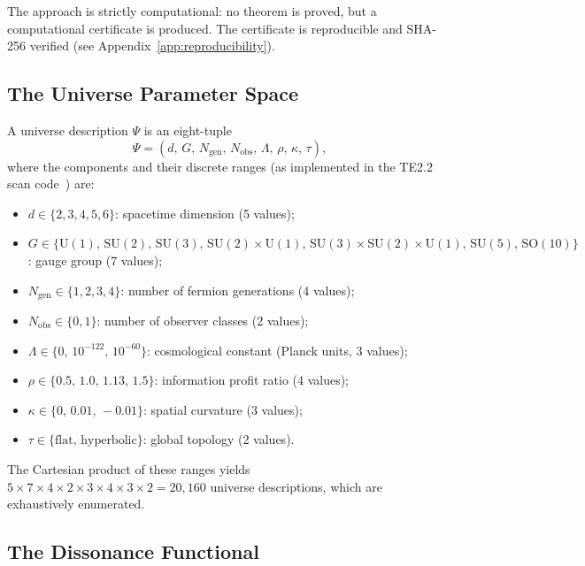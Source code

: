 \documentclass[11pt,twocolumn]{article}
\theoremstyle{remark}
\begin{document}
The approach is strictly computational: no theorem is proved, but a
computational certificate is produced.
The certificate is reproducible and SHA-256 verified
(see Appendix~\ref{app:reproducibility}).

\subsection{The Universe Parameter Space}
\label{sec:params}

A universe description $\Psi$ is an eight-tuple
\begin{equation}
  \Psi = (d,\, G,\, N_{\mathrm{gen}},\, N_{\mathrm{obs}},\, \Lambda,\,
         \rho,\, \kappa,\, \tau),
  \label{eq:psi}
\end{equation}
where the components and their discrete ranges (as implemented in the
TE2.2 scan code~\cite{SpivackPSCConcordance,ugp-physics-repo}) are:
\begin{itemize}
  \item $d \in \{2, 3, 4, 5, 6\}$: spacetime dimension (5 values);
  \item $G \in \{\mathrm{U}(1),\allowbreak\, \mathrm{SU}(2),\allowbreak\,
                \mathrm{SU}(3),\allowbreak\,
                \mathrm{SU}(2){\times}\mathrm{U}(1),\allowbreak\,
                \mathrm{SU}(3){\times}\mathrm{SU}(2){\times}\mathrm{U}(1),\allowbreak\,
                \mathrm{SU}(5),\allowbreak\, \mathrm{SO}(10)\}$:
                gauge group (7 values);
  \item $N_{\mathrm{gen}} \in \{1, 2, 3, 4\}$: number of fermion
        generations (4 values);
  \item $N_{\mathrm{obs}} \in \{0, 1\}$: number of observer classes
        (2 values);
  \item $\Lambda \in \{0,\, 10^{-122},\, 10^{-60}\}$:
        cosmological constant (Planck units, 3 values);
  \item $\rho \in \{0.5,\, 1.0,\, 1.13,\, 1.5\}$:
        information profit ratio (4 values);
  \item $\kappa \in \{0,\, 0.01,\, -0.01\}$: spatial curvature
        (3 values);
  \item $\tau \in \{\text{flat},\, \text{hyperbolic}\}$:
        global topology (2 values).
\end{itemize}
The Cartesian product of these ranges yields
$5\times 7\times 4\times 2\times 3\times 4\times 3\times 2=20{,}160$
universe descriptions, which are exhaustively enumerated.

\subsection{The Dissonance Functional}
\label{sec:dissonance}
\end{document}
